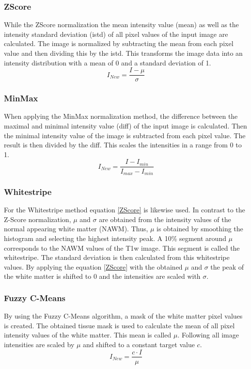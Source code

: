 \documentclass[journal]{IEEEtran}
\begin{document}
	\subsubsection{ZScore}
	While the ZScore normalization the mean intensity value (mean) as well as the intensity standard deviation (istd) of all pixel values of the input image are calculated. 
	The image is normalized by subtracting the mean from each pixel value and then dividing this by the istd.
	This transforms the image data into an intensity distribution with a mean of 0 and a standard deviation of 1.
		\begin{equation}\label{ZScore}
			I_{New} = \frac{I - \mu}{\sigma}
		\end{equation}
			
	\subsubsection{MinMax}
	When applying the MinMax normalization method, the difference between the maximal and minimal intensity value (diff) of the input image is calculated. 
	Then the minimal intensity value of the image is subtracted from each pixel value. The result is then divided by the diff.
	This scales the intensities in a range from 0 to 1. 
		\begin{equation}
			I_{New} = \frac{I - I_{min}}{I_{max} - I_{min}}
		\end{equation}
		
	\subsubsection{Whitestripe}
	For the Whitestripe method equation \ref{ZScore} is likewise used. In contrast to the Z-Score normalization, $\mu$ and $\sigma$ are obtained from the intensity values of the normal appearing white matter (NAWM). 
	Thus, $\mu$ is obtained by smoothing the histogram and selecting the highest intensity peak. A 10\% segment around $\mu$ corresponds to the NAWM values of the T1w image. This segment is called the whitestripe.
	The standard deviation is then calculated from this whitestripe values.
	By applying the equation \ref{ZScore} with the obtained $\mu$ and $\sigma$ the peak of the white matter is shifted to 0 and the intensities are scaled with $\sigma$.
	\smallskip
		
	\subsubsection{Fuzzy C-Means}
	By using the Fuzzy C-Means algorithm, a mask of the white matter pixel values is created. 
	The obtained tissue mask is used to calculate the mean of all pixel intensity values of the white matter. This mean is called $\mu$.
	Following all image intensities are scaled by $\mu$ and shifted to a constant target value $c$.
		\begin{equation}
			I_{New} = \frac{c \cdot I}{\mu}
		\end{equation}
	
\end{document}
